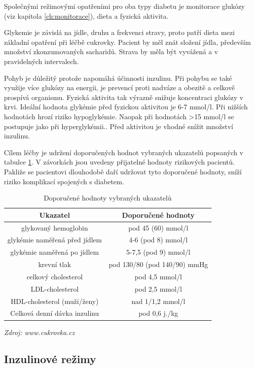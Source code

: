 Společnými režimovými opatřeními pro oba typy diabetu je monitorace glukózy (viz kapitola \ref{ch:monitorace}), dieta a fyzická aktivita.

Glykemie je závislá na jídle, druhu a frekvenci stravy, proto patří dieta mezi základní opatření při léčbě cukrovky. Pacient by měl znát složení jídla, především množství zkonzumovaných sacharidů. Strava by měla být vyvážená a v pravidelných intervalech.

Pohyb je důležitý protože napomáhá účinnosti inzulinu. Při pohybu se také využije více glukózy na energii, je prevencí proti nadváze a obezitě a celkově prospívá organismu. Fyzická aktivita tak výrazně snižuje koncentraci glukózy v krvi. Ideální hodnota glykémie před fyzickou aktivitou je 6-7 mmol/l. Při nižších hodnotách hrozí riziko hypoglykémie. Naopak při hodnotách >15 mmol/l se postupuje jako při hyperglykémii.. Před aktivitou je vhodné snížit množství inzulinu.

Cílem léčby je udržení doporučených hodnot vybraných ukazatelů popsaných v tabulce \ref{tab:ukazatele}. V závorkách jsou uvedeny přijatelné hodnoty rizikových pacientů. Pakliže se pacientovi dlouhodobě daří udržovat tyto doporučené hodnoty, sníží riziko komplikací spojených s diabetem.
\cite{Diabetes.Psottova,cukrovka.cz}

\begin{table}[H]
\caption{Doporučené hodnoty vybraných ukazatelů}
\label{tab:ukazatele}
\centering
\begin{tabular}{|c|c|}
\hline 
\textbf{Ukazatel} & \textbf{Doporu\v{c}ené hodnoty}\tabularnewline
\hline 
\hline 
glykovaný hemoglobin & pod 45 (60) mmol/l\\ \hline 
glykémie naměřená před jídlem & 4-6 (pod 8) mmol/l\\ \hline 
glykémie naměřená po jídlem & 5-7,5 (pod 9) mmol/l\\ \hline 
krevní tlak & pod 130/80 (pod 140/90) mmHg\\ \hline 
celkový cholesterol & pod 4,5 mmol/l\\ \hline 
LDL-cholesterol & pod 2,5 mmol/l\\ \hline 
HDL-cholesterol (muži/ženy) & nad 1/1,2 mmol/l\\ \hline 
Celková denní dávka inzulinu & pod 0,6 j./kg\\
\hline 
\end{tabular}
\textit{Zdroj: www.cukrovka.cz}
\end{table}


\subsection{Inzulinové režimy}
\label{ch:inzulin}

